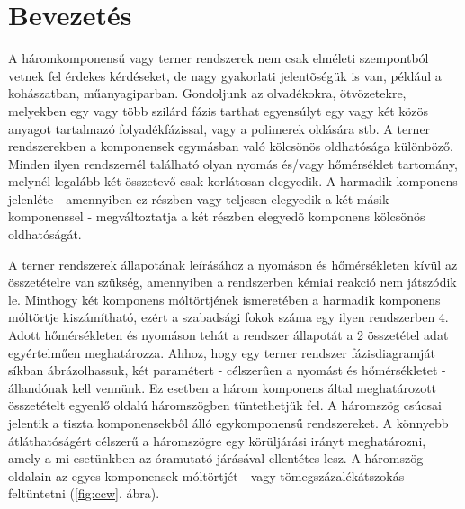 \documentclass{article}
\begin{document}
\section{Bevezetés}
A háromkomponensű vagy terner rendszerek nem csak elméleti szempontból vetnek fel érdekes kérdéseket, de nagy gyakorlati jelentõségük is van, például a kohászatban, műanyagiparban.
Gondoljunk az olvadékokra, ötvözetekre, melyekben egy vagy több szilárd fázis tarthat egyensúlyt egy vagy két közös anyagot tartalmazó folyadékfázissal, vagy a polimerek oldására stb.
A terner rendszerekben a komponensek egymásban való kölcsönös oldhatósága különböző.
Minden ilyen rendszernél található olyan nyomás és/vagy hőmérséklet tartomány, melynél legalább két összetevő csak korlátosan elegyedik.
A harmadik komponens jelenléte - amennyiben ez részben vagy teljesen elegyedik a két másik komponenssel - megváltoztatja a két részben elegyedõ komponens kölcsönös oldhatóságát.

A terner rendszerek állapotának leírásához a nyomáson és hőmérsékleten kívül az összetételre van szükség, amennyiben a rendszerben kémiai reakció nem játszódik le.
Minthogy két komponens móltörtjének ismeretében a harmadik komponens móltörtje kiszámítható, ezért a szabadsági fokok száma egy ilyen rendszerben 4.
Adott hőmérsékleten és nyomáson tehát a rendszer állapotát a 2 összetétel adat egyértelműen meghatározza.
Ahhoz, hogy egy terner rendszer fázisdiagramját síkban ábrázolhassuk, két paramétert - célszerûen a nyomást és hőmérsékletet - állandónak kell vennünk.
Ez esetben a három komponens által meghatározott összetételt egyenlő oldalú háromszögben tüntethetjük fel.
A háromszög csúcsai jelentik a tiszta komponensekből álló egykomponensű rendszereket.
A könnyebb átláthatóságért célszerű a háromszögre egy körüljárási irányt meghatározni, amely a mi esetünkben az óramutató járásával ellentétes lesz. A háromszög oldalain az egyes komponensek móltörtjét - vagy tömegszázalékátszokás feltüntetni (\ref{fig:ccw}. ábra).
\end{document}
